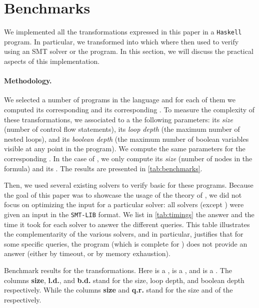 \section{Benchmarks}
\label{sec:benchmarks}

We implemented all the transformations expressed in this paper in a
\texttt{Haskell} program. In particular, we transformed  into  which where then used to
verify  using an SMT solver or the 
program. In this section, we will discuss the practical aspects of this
implementation.

\paragraph{Methodology.} We selected a number of programs in the  language and for each of them we computed its corresponding
 and its corresponding .
To measure the complexity of these transformations, we associated to a
 the following parameters: its \emph{size} (number
of control flow statements), its \emph{loop depth} (the maximum number of
nested loops), and its \emph{boolean depth} (the maximum number of boolean
variables visible at any point in the program). We compute the same parameters
for the corresponding . In the case of , we only compute its \emph{size} (number of nodes in the
formula) and its . The results are presented in
\cref{tab:benchmarks}.

Then, we used several existing solvers to verify basic  for these programs. Because the goal of this paper was to showcase the
usage of the theory of , we did not focus on
optimizing the input for a particular solver: all solvers (except )
were given an input in the \texttt{SMT-LIB} format. We list in
\cref{tab:timings} the answer and the time it took for each solver to answer
the different queries. This table illustrates the complementarity of the
various solvers, and in particular, justifies that for some specific queries,
the  program (which is complete for )
does not provide an answer (either by timeout, or by memory exhaustion).

\begin{table}
    \caption{Benchmark results for the transformations. 
        Here  is a ,
         is a ,
        and  is a .
        The columns \textbf{size}, \textbf{l.d.}, and \textbf{b.d.} stand for the size, loop depth, and boolean depth respectively. While the columns \textbf{size} and \textbf{q.r.} stand for the size and  of the 
         respectively.
    }
    \label{tab:benchmarks}
    \centering
    
\end{table}

